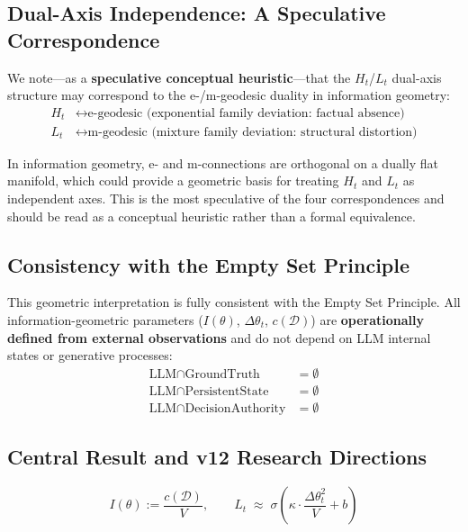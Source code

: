 \documentclass[11pt,a4paper]{article}
\begin{document}
\subsection{Dual-Axis Independence: A Speculative Correspondence}

We note---as a \textbf{speculative conceptual heuristic}---that the $H_t$/$L_t$ dual-axis
structure may correspond to the e-/m-geodesic duality in information geometry:
\begin{align}
H_t &\leftrightarrow \text{e-geodesic (exponential family deviation: factual absence)} \\
L_t &\leftrightarrow \text{m-geodesic (mixture family deviation: structural distortion)}
\end{align}

In information geometry, e- and m-connections are orthogonal on a dually flat manifold,
which could provide a geometric basis for treating $H_t$ and $L_t$ as independent axes.
This is the most speculative of the four correspondences and should be read as
a conceptual heuristic rather than a formal equivalence.

\subsection{Consistency with the Empty Set Principle}

This geometric interpretation is fully consistent with the Empty Set Principle.
All information-geometric parameters ($I(\theta)$, $\Delta\theta_t$, $c(\mathcal{D})$)
are \textbf{operationally defined from external observations}
and do not depend on LLM internal states or generative processes:
\begin{align}
\text{LLM} \cap \text{GroundTruth}      &= \emptyset \\
\text{LLM} \cap \text{PersistentState}  &= \emptyset \\
\text{LLM} \cap \text{DecisionAuthority}&= \emptyset
\end{align}

\subsection{Central Result and v12 Research Directions}

\begin{equation}
\boxed{
I(\theta) := \frac{c(\mathcal{D})}{V},
\qquad
L_t \;\approx\; \sigma\!\left(\kappa \cdot \frac{\Delta\theta_t^2}{V} + b\right)
}
\end{equation}
\end{document}
